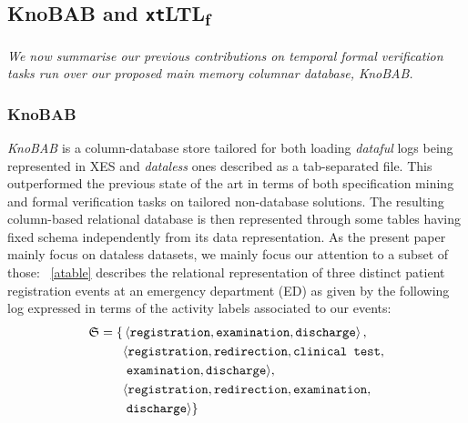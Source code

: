 \documentclass[sigconf]{acmart}
\begin{document}
\subsection{KnoBAB and \texttt{xt}LTL\textsubscript{f}}
\textit{We now summarise our previous contributions on temporal formal verification tasks run over our proposed main memory columnar database, KnoBAB.}
\subsubsection{KnoBAB}
\textit{KnoBAB} \cite{info14030173,computers12090185} is a column-database store tailored for both loading \textit{dataful} logs being represented in XES \cite{DBLP:journals/cim/AcamporaVSAGV17} and \textit{dataless} ones described as a tab-separated file. This outperformed the previous state of the art in terms of both specification mining \cite{APrioriDeclare} and formal verification \cite{BurattinMS16} tasks on tailored non-database solutions.  The resulting column-based relational database is then represented through some tables having fixed schema independently from its data representation. As the present paper mainly focus on dataless datasets, we mainly focus our attention to a subset of those: \tablename~\ref{atable} describes the relational representation of three distinct patient registration events at an emergency department (ED) \cite{Petsis2022} as given by the following log expressed in terms of the activity labels associated to our events:
\begin{equation}\label{ourLog}
\begin{split}
\mathfrak{S}=\{&\braket{\texttt{registration},\texttt{examination},\texttt{discharge}},\\
      &\langle\texttt{registration},\texttt{redirection},\texttt{clinical test},\\
      &\;\texttt{examination}, \texttt{discharge}  \rangle,\\
      &\langle\texttt{registration},\texttt{redirection},\texttt{examination},\\
      &\; \texttt{discharge}  \rangle\}\\
\end{split}
\end{equation}
\end{document}
